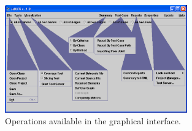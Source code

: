 \begin{figure}[!ht]
\begin{center}
\includegraphics[width=0.7\textwidth]{fig/main-window-editted}
\caption{\label{fig:tool}Operations available in the graphical
interface.}
\end{center}
\end{figure}
